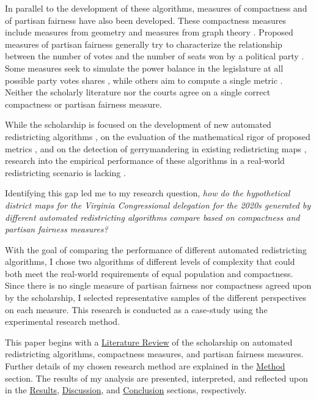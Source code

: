 In parallel to the development of these algorithms, measures of compactness and of partisan fairness have also been developed. These compactness measures include measures from geometry \parencite[e.g.][]{polsby1991, schwartzberg1966,harris1964, maceachren1985, reock1961, boyce1964} and measures from graph theory \parencite[e.g.][]{dube2016}. Proposed measures of partisan fairness generally try to characterize the relationship between the number of votes and the number of seats won by a political party \parencite{katz2020}. Some measures seek to simulate the power balance in the legislature at all possible party votes shares \parencite[e.g.][]{tufte1973}, while others aim to compute a single metric \parencite[e.g.][]{stephanopoulos2015,katz2020,warrington2018,mcdonald2015,wang2016}. Neither the scholarly literature nor the courts agree on a single correct compactness or partisan fairness measure. 

While the scholarship is focused on the development of new automated redistricting algorithms \parencite{fifield2020}, on the evaluation of the mathematical rigor of proposed metrics \parencite[see][]{katz2020}, and on the detection of gerrymandering in existing redistricting maps \parencite[e.g.][]{herschlag2017, duchin2018a}, research into the empirical performance of these algorithms in a real-world redistricting scenario is lacking \parencite{fifield2020a}.

Identifying this gap led me to my research question, \emph{how do the hypothetical district maps for the Virginia Congressional delegation for the 2020s generated by different automated redistricting algorithms compare based on compactness and partisan fairness measures?}

With the goal of comparing the performance of different automated redistricting algorithms, I chose two algorithms of different levels of complexity that could both meet the real-world requirements of equal population and compactness. Since there is no single measure of partisan fairness nor compactness agreed upon by the scholarship, I selected representative samples of the different perspectives on each measure. This research is conducted as a case-study using the experimental research method.

This paper begins with a \hyperref[sec:litreview]{Literature Review} of the scholarship on automated redistricting algorithms, compactness measures, and partisan fairness measures. Further details of my chosen research method are explained in the \hyperref[sec:method]{Method} section. The results of my analysis are presented, interpreted, and reflected upon in the \hyperref[sec:results]{Results}, \hyperref[sec:disc]{Discussion}, and \hyperref[sec:conc]{Conclusion} sections, respectively.

